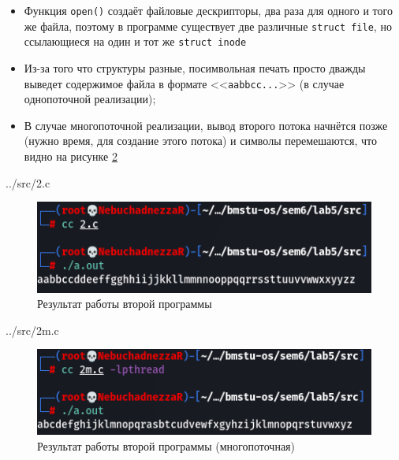 \begin{itemize}
	\item Функция \texttt{open()} создаёт файловые дескрипторы, два раза для одного и того же файла, поэтому в программе существует две различные \texttt{struct file}, но ссылающиеся на один	и тот же \texttt{struct inode}

	\item Из-за того что структуры разные, посимвольная печать просто дважды выведет содержимое файла в формате <<\texttt{aabbcc...}>> (в случае однопоточной реализации);

	\item В случае многопоточной реализации, вывод второго потока начнётся позже (нужно время, для создание этого потока) и символы перемешаются, что видно на рисунке \ref{fig:res2m}
\end{itemize}

\clearpage

\begin{lstinputlisting}[
	caption={Исходный код второй программы},
	style={c},
	]{../src/2.c}
\end{lstinputlisting}

\begin{figure}[h!btp]
	\centering
	\includegraphics[width=400pt]{inc/2.png}
	\caption{Результат работы второй программы}
	\label{fig:res2}	
\end{figure}

\clearpage

\begin{lstinputlisting}[
	caption={Исходный код второй программы (многопоточная)},
	style={c},
	]{../src/2m.c}
\end{lstinputlisting}

\begin{figure}[h!btp]
	\centering
	\includegraphics[width=400pt]{inc/2m.png}
	\caption{Результат работы второй программы (многопоточная)}
	\label{fig:res2m}	
\end{figure}

